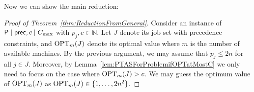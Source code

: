 Now we can show the main reduction: 
\begin{proof}[Proof of Theorem~\ref{thm:ReductionFromGeneral}] 
	
  Consider an instance of $\mathsf{P} \mid \mathsf{prec}, c \mid C_{\max}$ with $p_j, c \in \mathbb{N}$.
  Let $J$ denote its job set with precedence constraints, and $\textnormal{OPT}_m(J)$ denote its optimal value where $m$ is the number of
  available machines. 
  By the previous argument, we may assume that $p_j \leq 2n$ for all $j \in J$. 
  Moreover, by Lemma~\ref{lem:PTASForProblemifOPTatMostC} we only need to focus on the case where $\textnormal{OPT}_m(J) > c$.
  We may guess the optimum value of $\textnormal{OPT}_m(J)$ as $\textnormal{OPT}_m(J) \in \{ 1,\ldots,2n^2\}$. 


\end{proof}
